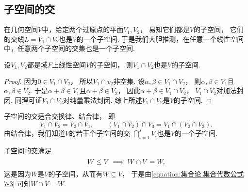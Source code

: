 \subsection{子空间的交}
在几何空间\(V\)中，给定两个过原点的平面\(V_1,V_2\)，
易知它们都是\(V\)的子空间，
它们的交线\(L = V_1 \cap V_2\)也是\(V\)的一个子空间.
于是我们大胆推测，在任意一个线性空间中，任意两个子空间的交集也是一个子空间.
\begin{theorem}
设\(V_1,V_2\)都是域\(F\)上线性空间\(V\)的子空间，
则\(V_1 \cap V_2\)也是\(V\)的子空间.
\begin{proof}
因为\(0\in V_1 \cap V_2\)，
所以\(V_1 \cap v_2\)非空集.
设\(\alpha,\beta\in V_1 \cap V_2\)，
则\(\alpha,\beta\in V_1\)且\(\alpha,\beta\in V_2\).
于是\(\alpha+\beta\in V_1\)且\(\alpha+\beta\in V_2\)，
因此\(\alpha+\beta\in V_1 \cap V_2\)，
\(V_1 \cap V_2\)对加法封闭.
同理可证\(V_1 \cap V_2\)对纯量乘法封闭.
综上所述\(V_1 \cap V_2\)是\(V\)的子空间.
\end{proof}
\end{theorem}

子空间的交适合交换律、结合律，
即\begin{equation*}
	V_1 \cap V_2
	=V_2 \cap V_1, \qquad
	(V_1 \cap V_2) \cap V_3
	=V_1 \cap (V_2 \cap V_3).
\end{equation*}
由结合律，我们知道\(V\)的若干个子空间的交
\(\bigcap_{i=1}^s V_i\)也是\(V\)的一个子空间.

子空间的交满足\begin{equation*}
	W \leq V
	\implies
	W \cap V = W.
\end{equation*}
这是因为\(W\)是\(V\)的子空间，从而有\(W \subseteq V\)，
于是由\cref{equation:集合论.集合代数公式7-3} 可知\(W \cap V = W\).

